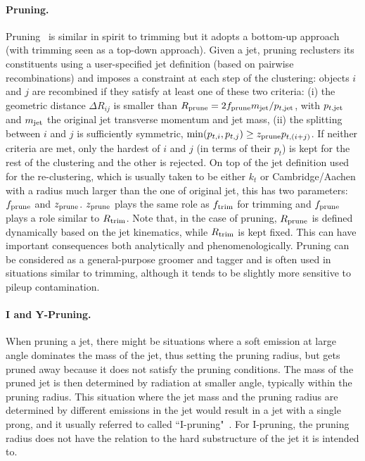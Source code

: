 \paragraph{Pruning.} Pruning~\cite{Ellis:2009su} is similar in spirit
to trimming but it adopts a bottom-up approach (with trimming seen as
a top-down approach). Given a jet, pruning reclusters its constituents
using a user-specified jet definition (based on pairwise
recombinations) and imposes a constraint at each step of the
clustering: objects $i$ and $j$ are recombined if they satisfy at
least one of these two criteria: (i) the geometric distance
$\Delta R_{ij}$ is
smaller than
$R_{\rm prune}=2 f_{\rm prune} m_{\rm jet}/p_{t,\rm jet}$, with
$p_{t,\rm jet}$ and $m_{\rm jet}$ the original jet transverse momentum
and jet mass, (ii) the splitting between $i$ and $j$ is sufficiently
symmetric, \ie
${\rm min}(p_{t,i},p_{t,j})\ge z_{\rm prune}p_{t,(i+j)}$. If neither criteria are met, only the hardest of $i$ and $j$ (in terms of
their $p_t$) is kept for the rest of the clustering and the other is
rejected.
%
On top of the jet definition used for the re-clustering, which is
usually taken to be either $k_t$ or Cambridge/Aachen with a radius
much larger than the one of original jet, this has two parameters:
$f_{\rm prune}$ and $z_{\rm prune}$. 
%
$z_{\rm prune}$ plays the same role as $f_{\rm trim}$ for trimming and
$f_{\rm prune}$ plays a role similar to $R_{\rm trim}$. Note that, in
the case of pruning, $R_{\rm prune}$ is defined dynamically based on the
jet kinematics, while $R_{\rm trim}$ is kept fixed. This can have
important consequences both analytically and phenomenologically.
%
Pruning can be considered as a general-purpose groomer and tagger
and is often used in situations similar to trimming, although it tends
to be slightly more sensitive to pileup contamination.

\paragraph{I and Y-Pruning.} When pruning a jet, there might be
situations where a soft emission at large angle dominates the mass of
the jet, thus setting the pruning radius, but gets pruned away because it does not satisfy the pruning
conditions. The mass of the pruned jet is then determined by radiation
at smaller angle, typically within the pruning radius. This situation
where the jet mass and the pruning radius are determined by different
emissions in the jet would result in a jet with a single prong, and it usually referred to 
called ``I-pruning"~\cite{Dasgupta:2013ihk}. For I-pruning, the pruning radius does not have the
relation to the hard substructure of the jet it is intended to.

